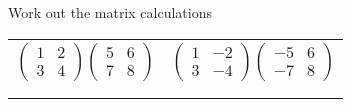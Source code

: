\documentclass[fontsize=20pt]{scrartcl}
\begin{document}
\newpage
Work out the matrix calculations
\newline
\newline
\begin{tabular}{p{13cm}p{13cm}}
$\begin{pmatrix}1&2\\3&4 \end{pmatrix} \begin{pmatrix}5&6\\7&8 \end{pmatrix}$
&$\begin{pmatrix}1&-2\\3&-4 \end{pmatrix} \begin{pmatrix}-5&6\\-7&8 \end{pmatrix}$
\\\\\\

\end{tabular}
\end{document}
